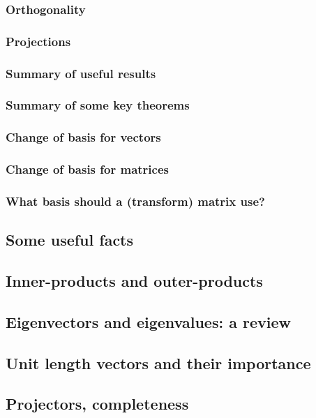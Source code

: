\documentclass[main.tex]{subfiles}
\begin{document}
    \subsubsection{Orthogonality}
    
    \subsubsection{Projections}
    
    \subsubsection{Summary of useful results}
    
    \subsubsection{Summary of some key theorems}
    
    \subsubsection{Change of basis for vectors}
    
    \subsubsection{Change of basis for matrices}
    
    \subsubsection{What basis should a (transform) matrix use?}

\subsection{Some useful facts}

\subsection{Inner-products and outer-products}

\subsection{Eigenvectors and eigenvalues: a review}

\subsection{Unit length vectors and their importance}

\subsection{Projectors, completeness}
\end{document}
